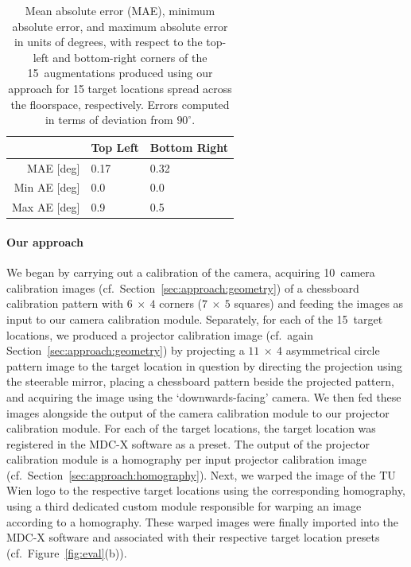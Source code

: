 \documentclass[review]{elsarticle}
\begin{document}
\begin{table}[ht!]
\caption{Mean absolute error (MAE), minimum absolute error, and maximum absolute error in units of degrees, with respect to the top-left and bottom-right corners of the 15~augmentations produced using our approach for 15 target locations spread across the floorspace, respectively. Errors computed in terms of deviation from $90^\circ{}$.}
\label{table:angle}
\centering
{\small
\begin{tabularx}{6.75cm}{r p{1.95cm} p{1.95cm}}
\toprule
  & Top Left & Bottom Right \\
\midrule
MAE {\tiny[deg]} & 0.17 & 0.32 \\
Min AE {\tiny[deg]} & 0.0 & 0.0 \\
Max AE {\tiny[deg]} & 0.9 & 0.5 \\
\bottomrule
\end{tabularx}}
\end{table}

\paragraph{Our approach} We began by carrying out a calibration of the camera, acquiring 10~camera calibration images (cf.\ Section~\ref{sec:approach:geometry}) of a chessboard calibration pattern with $6~\times~4$ corners ($7~\times~5$ squares) and feeding the images as input to our camera calibration module. Separately, for each of the 15~target locations, we produced a projector calibration image (cf.\ again Section~\ref{sec:approach:geometry}) by projecting a $11~\times~4$ asymmetrical circle pattern image to the target location in question by directing the projection using the steerable mirror, placing a chessboard pattern beside the projected pattern, and acquiring the image using the `downwards-facing' camera. We then fed these images alongside the output of the camera calibration module to our projector calibration module. For each of the target locations, the target location was registered in the MDC-X software as a preset. The output of the projector calibration module is a homography per input projector calibration image (cf.\ Section~\ref{sec:approach:homography}). Next, we warped the image of the TU Wien logo to the respective target locations using the corresponding homography, using a third dedicated custom module responsible for warping an image according to a homography. These warped images were finally imported into the MDC-X software and associated with their respective target location presets (cf.\ Figure~\ref{fig:eval}(b)).
\end{document}
